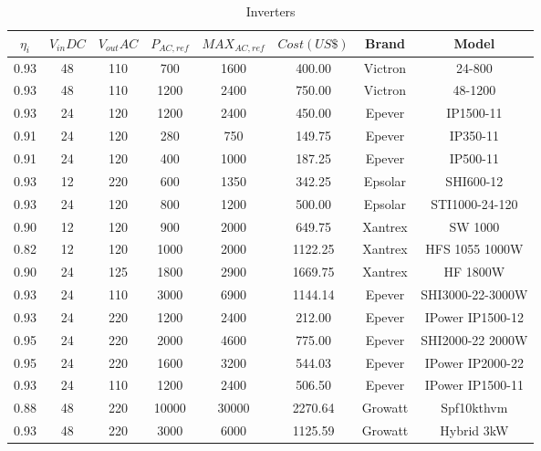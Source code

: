 \documentclass[journal,onecolumn]{IEEEtran}
\begin{document}

\begin{table}[h]
\renewcommand{\arraystretch}{1.3}
\caption{Inverters}\label{tab:inverter}
\centering
\begin{scriptsize}
\begin{tabular}{c|c|c|c|c|c|c|c}
\hline
\hline
$\eta_{i}$ & $V_{in}DC$  & $V_{out}AC$ & $P_{AC,ref}$  & $MAX_{AC,ref}$ & $Cost (US\$)$ & Brand & Model\\
\hline
\hline
0.93 & 48 & 110 & 700 & 1600 & 400.00 & Victron & 24-800 \\
\hline
0.93 & 48 & 110 & 1200 & 2400 & 750.00 & Victron & 48-1200 \\
\hline
0.93 & 24 & 120 & 1200 & 2400 & 450.00 & Epever & IP1500-11 \\
\hline
0.91 & 24 & 120 & 280 & 750 & 149.75 & Epever & IP350-11 \\
\hline
0.91 & 24 & 120 & 400 & 1000 & 187.25 & Epever &  IP500-11 \\
\hline
0.93 & 12 & 220 & 600 & 1350 & 342.25 & Epsolar & SHI600-12 \\
\hline
0.93 & 24 & 120 & 800 & 1200 & 500.00 & Epsolar & STI1000-24-120 \\
\hline
0.90 & 12 & 120 & 900 & 2000 & 649.75 & Xantrex & SW 1000 \\
\hline
0.82 & 12 & 120 & 1000 & 2000 & 1122.25 & Xantrex & HFS 1055 1000W \\
\hline
0.90 & 24 & 125 & 1800 & 2900 & 1669.75 & Xantrex & HF 1800W \\
\hline
0.93 & 24 & 110 & 3000 & 6900 & 1144.14 & Epever & SHI3000-22-3000W \\
\hline
0.93 & 24 & 220 & 1200 & 2400 & 212.00 & Epever & IPower IP1500-12 \\
\hline
0.95 & 24 & 220 & 2000 & 4600 & 775.00 & Epever & SHI2000-22 2000W \\
\hline
0.95 & 24 & 220 & 1600 & 3200 & 544.03 & Epever & IPower IP2000-22 \\
\hline
0.93 & 24 & 110 & 1200 & 2400 & 506.50 & Epever & IPower IP1500-11 \\
\hline
0.88 & 48 & 220 & 10000 & 30000 & 2270.64 & Growatt & Spf10kthvm \\
\hline
0.93 & 48 & 220 & 3000 & 6000 & 1125.59 & Growatt & Hybrid 3kW \\
\hline
\hline
\end{tabular}
\end{scriptsize}
\end{table}
\end{document}
